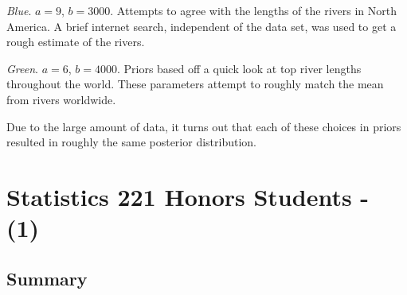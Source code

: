 \documentclass[12pt]{article}
\begin{document}
\noindent \emph{Blue}. $a=9$, $b=3000$.  Attempts to agree with the lengths of the rivers in North America.  A brief internet search, independent of the data set, was used to get a rough estimate of the rivers.

\noindent \emph{Green}. $a=6$, $b=4000$.  Priors based off a quick look at top river lengths throughout the world.  These parameters attempt to roughly match the mean from rivers worldwide.
\bigskip

\noindent Due to the large amount of data, it turns out that each of these choices in priors resulted in roughly the same posterior distribution.

%
%
%

\newpage

\section{Statistics 221 Honors Students - (1)}

\subsection{Summary}
\end{document}
